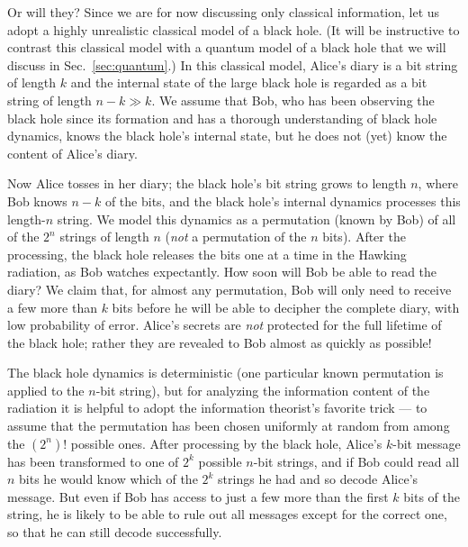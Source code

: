 \documentclass[11pt]{article}
\begin{document}
Or will they? Since we are for now discussing only classical information, let us adopt a highly unrealistic classical model of a black hole. (It will be instructive to contrast this classical model with a quantum model of a black hole that we will discuss in Sec.~\ref{sec:quantum}.) In this classical model, Alice's diary is a bit string of length $k$ and the internal state of the large black hole is regarded as a bit string of length $n-k \gg k$.  We assume that Bob, who has been observing the black hole since its formation and has a thorough understanding of black hole dynamics, knows the black hole's internal state, but he does not (yet) know the content of Alice's diary.

Now Alice tosses in her diary; the black hole's bit string grows to length $n$, where Bob knows $n-k$ of the bits, and the black hole's internal dynamics processes this length-$n$ string. We model this dynamics as a permutation (known by Bob) of all of the $2^n$ strings of length $n$ ({\em not} a permutation of the $n$ bits). After the processing, the black hole releases the bits one at a time in the Hawking radiation, as Bob watches expectantly. How soon will Bob be able to read the diary? We claim that, for almost any permutation, Bob will only need to receive a few more than $k$ bits before he will be able to decipher the complete diary, with low probability of error. Alice's secrets are {\em not} protected for the full lifetime of the black hole; rather they are revealed to Bob almost as quickly as possible! 

The black hole dynamics is deterministic (one particular known permutation is applied to the $n$-bit string), but for analyzing the information content of the radiation it is helpful to adopt the information theorist's favorite trick --- to assume that the permutation has been chosen uniformly at random from among the $\left(2^n\right)!$ possible ones. After processing by the black hole, Alice's $k$-bit message has been transformed to one of $2^k$ possible $n$-bit strings, and if Bob could read all $n$ bits he would know which of the $2^k$ strings he had and so decode Alice's message. But even if Bob has access to just a few more than the first $k$ bits of the string, he is likely to be able to rule out all messages except for the correct one, so that he can still decode successfully.
\end{document}
